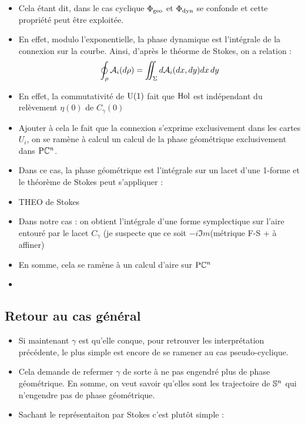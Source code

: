 \begin{itemize}
	
	\item Cela étant dit, dans le cas cyclique $\phaseg$ et $\phased$ se confonde et cette propriété peut être exploitée.
	
	\item En effet, modulo l'exponentielle, la phase dynamique est l'intégrale de la connexion sur la courbe. Ainsi, d'après le théorme de Stokes, on a relation :
	\[\oint_\rho \locconn_i(d\rho) = \iint_\Sigma d\locconn_i(dx,dy) dx\,dy\]
	
	\item En effet,  la commutativité de $\U{1}$ fait que $\Hol$ est indépendant du relèvement $\eta(0)$ de $C_\gamma(0)$ 
	
	\item Ajouter à cela le fait que la connexion s'exprime exclusivement dans les cartes $U_i$, on se ramène à calcul un calcul de la phase géométrique exclusivement dans $\PC{n}$.
	
	\item Dans ce cas, la phase géométrique est l'intégrale sur un lacet d'une 1-forme et le théorème de Stokes peut s'appliquer :
	
	\item THEO de Stokes
	
	\item Dans notre cas : on obtient l’intégrale d'une forme symplectique sur l'aire entouré par le lacet $C_\gamma$ (je suspecte que ce soit $-i\Im m$(métrique F-S + à affiner) 
	
	\item En somme, cela se ramène à un calcul d'aire sur $\PC{n}$
	
	\item {}
	
\end{itemize}


\subsection{Retour au cas général}

\begin{itemize}
	\item Si maintenant $\gamma$ est qu'elle conque, pour retrouver les interprétation précédente, le plus simple est encore de se ramener au cas pseudo-cyclique.
	
	\item Cela demande de refermer $\gamma$ de sorte à ne pas engendré plus de phase géométrique. En somme, on veut savoir qu'elles sont les trajectoire de $\S{n}$ qui n'engendre pas de phase géométrique.
	
	\item Sachant le représentaiton par Stokes c'est plutôt simple : 
\end{itemize}




